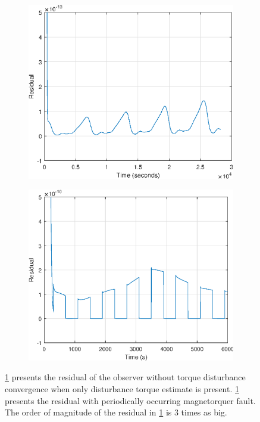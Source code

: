 
\begin{figure}[H]
	\begin{subfigure}{0.5\linewidth}
	\centering
	\includegraphics[width=1\linewidth]{figures/constdistonly_res}
	\label{fig:residualdist}	
	\end{subfigure}
	\begin{subfigure}{0.5\linewidth}
	\centering
	\includegraphics[width=1\linewidth]{figures/mt_fault_res}
	\label{fig:residualmt}
	\end{subfigure}
\caption{\ref{fig:residualdist} presents the residual of the observer without torque disturbance convergence when only disturbance torque estimate is present. \ref{fig:residualdist} presents the residual with periodically occurring magnetorquer fault. The order of magnitude of the residual in \ref{fig:residualdist} is 3 times as big.}
\end{figure}

